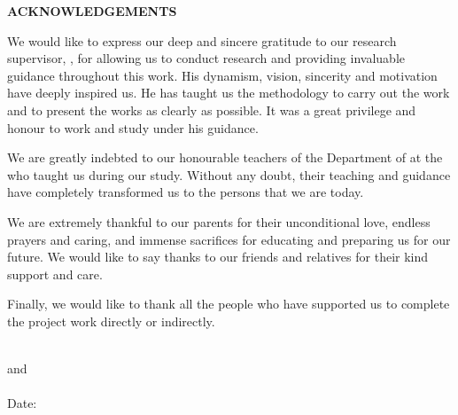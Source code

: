 \thispagestyle{plain}

\begin{center}
 \Large {\bf \uppercase{Acknowledgements}}
\end{center}

\vspace{3\baselineskip}

\noindent
We would like to express our deep and sincere gratitude to our research supervisor, \emph{\Supervisor}, for allowing us to conduct research and providing invaluable guidance throughout this work. His dynamism, vision, sincerity and motivation have deeply inspired us. He has taught us the methodology to carry out the work and to present the works as clearly as possible. It was a great privilege and honour to work and study under his guidance. 

We are greatly indebted to our honourable teachers of the Department of \Department at the \University who taught us during our study. Without any doubt, their teaching and guidance have completely transformed us to the persons that we are today.

We are extremely thankful to our parents for their unconditional love, endless prayers and caring, and immense sacrifices for educating and preparing us for our future. We would like to say thanks to our friends and relatives for their kind support and care.

Finally, we would like to thank all the people who have supported us to complete the project work directly or indirectly.


\noindent
\vspace{\baselineskip} \\
\textbf{\firstAuthor} and  \textbf{\secondAuthor}\\
\University \\
Date: \reportSubmissionDate
